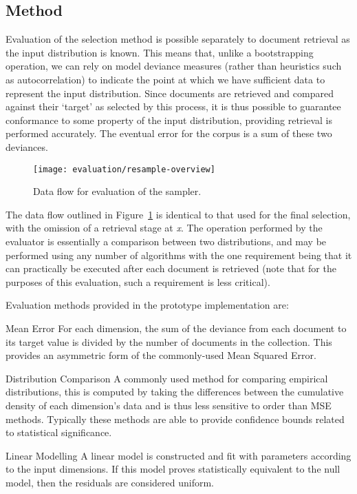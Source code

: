 \subsection{Method}
Evaluation of the selection method is possible separately to document retrieval as the input distribution is known.  This means that, unlike a bootstrapping operation, we can rely on model deviance measures (rather than heuristics such as autocorrelation) to indicate the point at which we have sufficient data to represent the input distribution.  Since documents are retrieved and compared against their `target' as selected by this process, it is thus possible to guarantee conformance to some property of the input distribution, providing retrieval is performed accurately.  The eventual error for the corpus is a sum of these two deviances.


\begin{figure}[Ht]
    \centering
    \texttt{[image: evaluation/resample-overview]}
    \caption{Data flow for evaluation of the sampler.}
    \label{fig:evaluation:resampling:overview}
\end{figure}


The data flow outlined in Figure~\ref{fig:evaluation:resampling:overview} is identical to that used for the final selection, with the omission of a retrieval stage at \textsl{\color{red} x}.  The operation performed by the evaluator is essentially a comparison between two distributions, and may be performed using any number of algorithms with the one requirement being that it can practically be executed after each document is retrieved (note that for the purposes of this evaluation, such a requirement is less critical).

Evaluation methods provided in the prototype implementation are:

\begin{itemizeTitle}

    \item[Mean Error] For each dimension, the sum of the deviance from each document to its target value is divided by the number of documents in the collection.  This provides an asymmetric form of the commonly-used Mean Squared Error.
    \item[Distribution Comparison] A commonly used method for comparing empirical distributions, this is computed by taking the differences between the cumulative density of each dimension's data and is thus less sensitive to order than MSE methods.  Typically these methods are able to provide confidence bounds related to statistical significance.
    \item[Linear Modelling] A linear model is constructed and fit with parameters according to the input dimensions.  If this model proves statistically equivalent to the null model, then the residuals are considered uniform.

\end{itemizeTitle}



